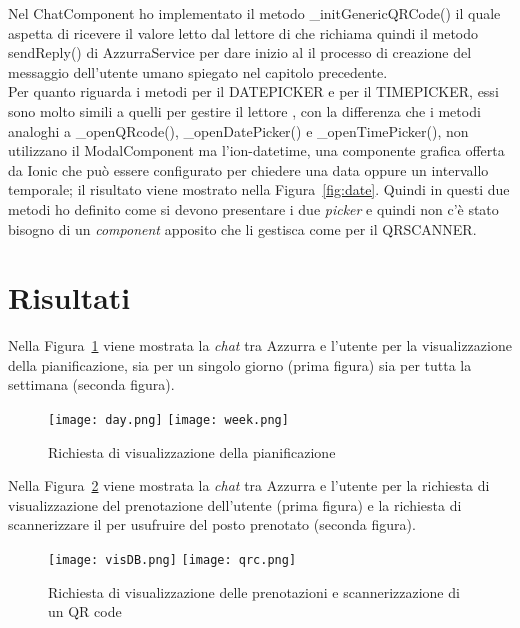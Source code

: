   Nel ChatComponent ho implementato il metodo \_initGenericQRCode() il quale aspetta di ricevere il valore letto dal lettore di  che richiama quindi il metodo sendReply() di AzzurraService per dare inizio al il processo di creazione del messaggio dell'utente umano spiegato nel capitolo precedente. \\
  
  Per quanto riguarda i metodi per il DATEPICKER e per il TIMEPICKER, essi sono molto simili a quelli per gestire il lettore , con la differenza che i metodi analoghi a \_openQRcode(), \_openDatePicker() e \_openTimePicker(), non utilizzano il ModalComponent ma l'ion-datetime, una componente grafica offerta da Ionic che può essere configurato per chiedere una data oppure un intervallo temporale; il risultato viene mostrato nella Figura~\ref{fig:date}. Quindi in questi due metodi ho definito come si devono presentare i due \emph{picker} e quindi non c'è stato bisogno di un \emph{component} apposito che li gestisca come per il QRSCANNER. 
\section{Risultati}

Nella Figura~\ref{fig:planning} viene mostrata la \emph{chat} tra Azzurra e l'utente per la visualizzazione della pianificazione, sia per un singolo giorno (prima figura) sia per tutta la settimana (seconda figura).\\

\begin{figure}[h]
	\begin{center}
		\texttt{[image: day.png]}\hfil
		\texttt{[image: week.png]}
		\caption{Richiesta di visualizzazione della pianificazione}\label{fig:planning}
	\end{center}
\end{figure}

Nella Figura~\ref{fig:QRc} viene mostrata la \emph{chat} tra Azzurra e l'utente per la richiesta di visualizzazione del prenotazione dell'utente (prima figura) e la richiesta di scannerizzare il  per usufruire del posto prenotato (seconda figura).\\

\begin{figure}[h]
	\begin{center}
		\texttt{[image: visDB.png]}\hfil
		\texttt{[image: qrc.png]}
		\caption{Richiesta di visualizzazione delle prenotazioni e scannerizzazione di un QR code}\label{fig:QRc}
	\end{center}
\end{figure}

